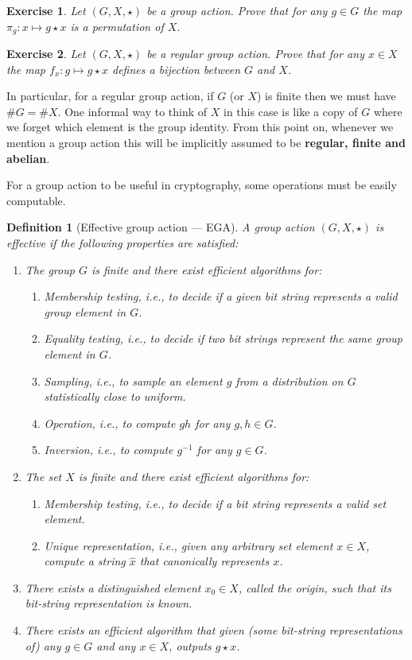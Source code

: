 \documentclass{article}
\newtheorem{ex}{Exercise}
\newtheorem{defi}{Definition}
\begin{document}
\begin{ex}
  Let $(G,X,\star)$ be a group action.  Prove that for any $g\in G$
  the map $\pi_g:x\mapsto g\star x$ is a permutation of $X$.
\end{ex}

\begin{ex}
  Let $(G,X,\star)$ be a regular group action.  Prove that for any
  $x\in X$ the map $f_x:g\mapsto g \star x$ defines a bijection
  between $G$ and $X$.
\end{ex}

In particular, for a regular group action, if $G$ (or $X$) is finite
then we must have $\#G= \#X$.  One informal way to think of $X$ in
this case is like a copy of $G$ where we forget which element is the
group identity.  From this point on, whenever we mention a group
action this will be implicitly assumed to be \textbf{regular, finite
  and abelian}.

For a group action to be useful in cryptography, some operations must
be easily computable.

\begin{defi}[Effective group action --- EGA]
  A group action $(G,X,\star )$ is \emph{effective} if the following
  properties are satisfied:
  \begin{enumerate}
  \item The group $G$ is finite and there exist efficient algorithms
    for:
    \begin{enumerate}
    \item \emph{Membership testing}, i.e., to decide if a given bit string
      represents a valid group element in $G$.
    \item \emph{Equality testing}, i.e., to decide if two bit strings
      represent the same group element in $G$.
    \item \emph{Sampling}, i.e., to sample an element $g$ from a
      distribution on $G$ statistically close to uniform.
    \item \emph{Operation}, i.e., to compute $gh$ for any $g,h\in G$.
    \item \emph{Inversion}, i.e., to compute $g^{-1}$ for any
      $g\in G$.
    \end{enumerate}
  \item The set $X$ is finite and there exist efficient algorithms for:
    \begin{enumerate}
    \item \emph{Membership testing}, i.e., to decide if a bit string
      represents a valid set element.
    \item \emph{Unique representation}, i.e., given any arbitrary set element $x\in X$, compute a string $\hat{x}$ that canonically represents $x$.
    \end{enumerate}
  \item There exists a distinguished element $x_0\in X$, called the
    \emph{origin}, such that its bit-string representation is
    known.
  \item There exists an efficient algorithm that given (some
    bit-string representations of) any $g\in G$ and any $x\in X$,
    outputs $g \star x$.
  \end{enumerate}
\end{defi}
\end{document}
